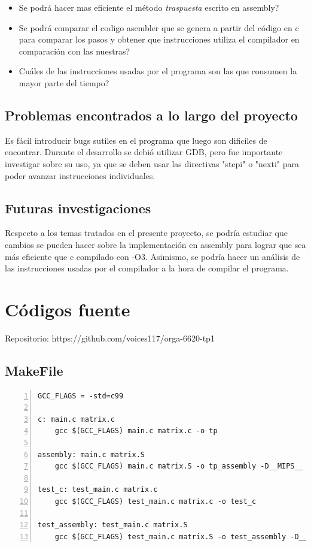 \documentclass[11pt,a4paper]{article}
\begin{document}
\begin{itemize}
\item Se podr\'a hacer mas eficiente el m\'etodo \textit{traspuesta} escrito en assembly?
\item Se podr\'a comparar el codigo asembler que se genera a partir del c\'odigo en c para comparar los pasos y obtener que instrucciones utiliza el compilador en comparaci\'on con las nuestras?
\item Cu\'ales de las instrucciones usadas por el programa son las que consumen la mayor parte del tiempo?
\end{itemize}

\subsection{Problemas encontrados a lo largo del proyecto}

Es f\'acil introducir bugs sutiles en el programa que luego son dificiles de 
encontrar. Durante el desarrollo se debi\'o utilizar GDB, pero fue importante
investigar sobre su uso, ya que se deben usar las directivas "stepi" o "nexti"
para poder avanzar instrucciones individuales.

\subsection{Futuras investigaciones}

Respecto a los temas tratados en el presente proyecto, se podr\'ia estudiar que cambios se pueden hacer sobre la implementaci\'on en assembly para lograr que sea m\'as eficiente que c compilado con -O3. Asimismo, se podr\'ia hacer un an\'alisis de las instrucciones usadas por el compilador a la hora de compilar el programa.


\newpage

\section{C\'odigos fuente}

Repositorio: https://github.com/voices117/orga-6620-tp1

\subsection{MakeFile}

\begin{lstlisting}[numbers=left, tabsize=2, basicstyle=\fontsize{11}{13}\ttfamily, frame=single, caption={makefile}]
GCC_FLAGS = -std=c99

c: main.c matrix.c
	gcc $(GCC_FLAGS) main.c matrix.c -o tp

assembly: main.c matrix.S
	gcc $(GCC_FLAGS) main.c matrix.S -o tp_assembly -D__MIPS__

test_c: test_main.c matrix.c
	gcc $(GCC_FLAGS) test_main.c matrix.c -o test_c

test_assembly: test_main.c matrix.S
	gcc $(GCC_FLAGS) test_main.c matrix.S -o test_assembly -D__MIPS__

\end{lstlisting}
\end{document}
